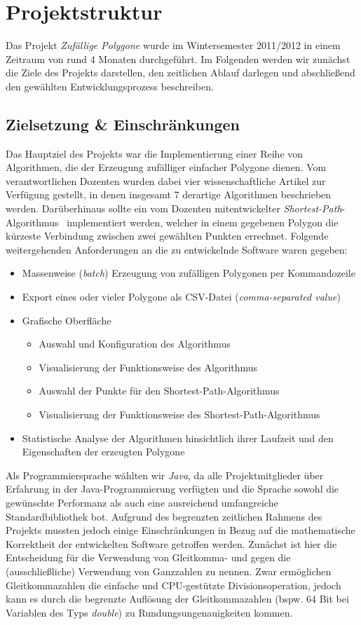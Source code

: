 \section{Projektstruktur}
Das Projekt \emph{Zufällige Polygone} wurde im Wintersemester 2011/2012 in einem Zeitraum von rund 4 Monaten durchgeführt. Im Folgenden werden wir zunächst die Ziele des Projekts darstellen, den zeitlichen Ablauf darlegen und abschließend den gewählten Entwicklungsprozess beschreiben.

\subsection{Zielsetzung \& Einschränkungen}
Das Hauptziel des Projekts war die Implementierung einer Reihe von Algorithmen, die der Erzeugung zufälliger einfacher Polygone dienen. Vom verantwortlichen Dozenten wurden dabei vier wissenschaftliche Artikel zur Verfügung gestellt, in denen insgesamt 7 derartige Algorithmen beschrieben werden. Darüberhinaus sollte ein vom Dozenten mitentwickelter \emph{Shortest-Path}-Algorithmus~\cite{asano11shortestpath} implementiert werden, welcher in einem gegebenen Polygon die kürzeste Verbindung zwischen zwei gewählten Punkten errechnet. Folgende weitergehenden Anforderungen an die zu entwickelnde Software waren gegeben:
\begin{itemize}
\item Massenweise (\emph{batch}) Erzeugung von zufälligen Polygonen per Kommandozeile
\item Export eines oder vieler Polygone als CSV-Datei (\emph{comma-separated value})
\item Grafische Oberfläche
\begin{itemize}
\item Auswahl und Konfiguration des Algorithmus
\item Visualisierung der Funktionsweise des Algorithmus
\item Auswahl der Punkte für den Shortest-Path-Algorithmus
\item Visualisierung der Funktionsweise des Shortest-Path-Algorithmus
\end{itemize}
\item Statistische Analyse der Algorithmen hinsichtlich ihrer Laufzeit und den Eigenschaften der erzeugten Polygone
\end{itemize}

Als Programmiersprache wählten wir \emph{Java}, da alle Projektmitglieder über Erfahrung in der Java-Programmierung verfügten und die Sprache sowohl die gewünschte Performanz als auch eine ausreichend umfangreiche Standardbibliothek bot. Aufgrund des begrenzten zeitlichen Rahmens des Projekts mussten jedoch einige Einschränkungen in Bezug auf die mathematische Korrektheit der entwickelten Software getroffen werden. Zunächst ist hier die Entscheidung für die Verwendung von Gleitkomma- und gegen die (ausschließliche) Verwendung von Ganzzahlen zu nennen. Zwar ermöglichen Gleitkommazahlen die einfache und CPU-gestützte Divisionsoperation, jedoch kann es durch die begrenzte Auflösung der Gleitkommazahlen (bspw. 64 Bit bei Variablen des Typs \emph{double}) zu Rundungsungenauigkeiten kommen. 


